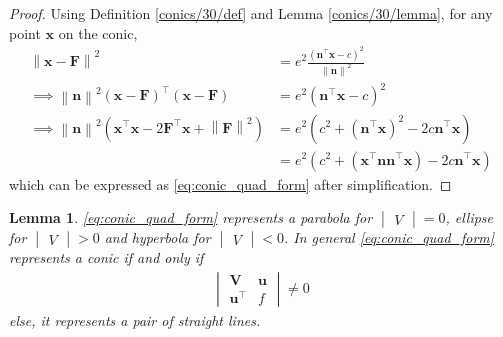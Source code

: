 \documentclass[]{interact}
\theoremstyle{plain}%
\newtheorem{lemma}[theorem]{Lemma}
\theoremstyle{definition}
\theoremstyle{remark}
\providecommand{\brak}[1]{\ensuremath{\left(#1\right)}}
\providecommand{\norm}[1]{\left\lVert#1\right\rVert}
\newcommand{\mydet}[1]{\ensuremath{\begin{vmatrix}#1\end{vmatrix}}}
\let\vec\mathbf
\begin{document}
\begin{proof}
  Using Definition \ref{conics/30/def} and Lemma \ref{conics/30/lemma},  for any point $\vec{x}$ on the conic,
\begin{align}
\norm{\vec{x}-\vec{F}}^2&=e^2 \frac{\brak{{\vec{n}^{\top}\vec{x} - c}}^2}{\norm{\vec{n}}^2}\label{conics/30/eq:1} \\
\implies \norm{\vec{n}}^2\brak{\vec{x}-\vec{F}}^{\top}\brak{\vec{x}-\vec{F}}&=e^2\brak{\vec{n}^{\top}\vec{x} - c}^2
\\
\implies \norm{\vec{n}}^2\brak{\vec{x}^{\top}\vec{x}-2\vec{F}^{\top}\vec{x}+\norm{\vec{F}}^2}&=e^2\brak{c^2+\brak{\vec{n}^{\top}\vec{x} }^2-2c\vec{n}^{\top}\vec{x}} \\
&=e^2\brak{c^2+\brak{\vec{x}^{\top}\vec{n}\vec{n}^{\top}\vec{x} }-2c\vec{n}^{\top}\vec{x}}
\end{align}
%
which can be expressed as \eqref{eq:conic_quad_form} after simplification.

\end{proof}
%
\begin{lemma}
  \eqref{eq:conic_quad_form} represents a parabola for $\mydet{V} = 0 $, ellipse for $\mydet{V} > 0 $ and hyperbola for $\mydet{V} < 0 $.  In general
\eqref{eq:conic_quad_form}  represents a conic  if and only if
\begin{align}
\mydet{
\vec{V}&\vec{u}
\\
\vec{u}^{\top}&f
}
\ne  0
\label{eq:quad_forms_pair_det}
\end{align}
%
else, it represents a pair of straight lines.
\end{lemma}
%
\end{document}

